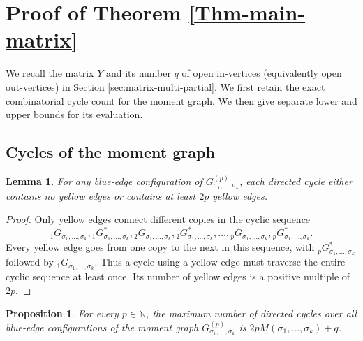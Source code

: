 \documentclass[12pt]{article}
\numberwithin{equation}{section}
\theoremstyle{plain}
\newtheorem{lemma}[theorem]{Lemma}
\newtheorem{proposition}[theorem]{Proposition}
\def\bN{\mathbb N}
\begin{document}
\section{Proof of Theorem \ref{Thm-main-matrix}} \label{sec:matrix}

We recall the matrix $Y$ and its number $q$ of open in-vertices (equivalently open out-vertices) in Section \ref{sec:matrix-multi-partial}.
We first retain the exact combinatorial cycle count for the moment graph. We then give separate lower and upper bounds for its evaluation.

\subsection{Cycles of the moment graph}

\begin{lemma}\label{Lem-moment-cycle}
For any blue-edge configuration of $G^{(p)}_{\sigma_1,\ldots,\sigma_k}$, each directed cycle either contains no yellow edges or contains at least $2p$ yellow edges.
\end{lemma}
\begin{proof}
Only yellow edges connect different copies in the cyclic sequence
\[
{}_1G_{\sigma_1,\ldots,\sigma_k}, {}_1G^*_{\sigma_1,\ldots,\sigma_k}, {}_2G_{\sigma_1,\ldots,\sigma_k}, {}_2G^*_{\sigma_1,\ldots,\sigma_k}, \ldots,{}_pG_{\sigma_1,\ldots,\sigma_k}, {}_pG^*_{\sigma_1,\ldots,\sigma_k}.
\]
Every yellow edge goes from one copy to the next in this sequence, with ${}_pG^*_{\sigma_1,\ldots,\sigma_k}$ followed by ${}_1G_{\sigma_1,\ldots,\sigma_k}$. Thus a cycle using a yellow edge must traverse the entire cyclic sequence at least once. Its number of yellow edges is a positive multiple of $2p$.
\end{proof}

\begin{proposition}\label{Prop-moment-cycle}
For every $p\in\bN$, the maximum number of directed cycles over all blue-edge configurations of the moment graph $G^{(p)}_{\sigma_1,\ldots,\sigma_k}$ is $2pM(\sigma_1,\ldots,\sigma_k)+q$.
\end{proposition}
\end{document}
